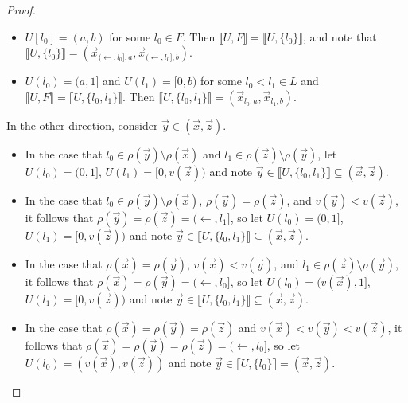 \documentclass[11pt]{article}
\newcommand{\vect}{\vec}
\newcommand{\lb}{\llbracket}
\newcommand{\rb}{\rrbracket}
\begin{document}
\begin{proof}
    \begin{itemize}
      \item
        \(U[l_0]=(a,b)\) for some \(l_0\in F\).
        Then \(\lb U,F\rb=\lb U,\{l_0\}\rb \), and note that
        \(
          \lb U,\{l_0\}\rb
            =
          (\vect x_{(\leftarrow,l_0],a},\vect x_{(\leftarrow,l_0],b})
        \).
      \item
        \(U(l_0)=(a,1]\) and \(U(l_1)=[0,b)\) for some \(l_0<l_1\in L\)
        and \(\lb U,F\rb=\lb U,\{l_0,l_1\}\rb \). Then
        \(\lb U,\{l_0,l_1\}\rb =(\vect x_{l_0,a},\vect x_{l_1,b})\).
    \end{itemize}
    In the other direction, consider \(\vect y\in(\vect x,\vect z)\).
    \begin{itemize}
      \item
        In the case that \(l_0\in\rho(\vect y)\setminus\rho(\vect x)\)
        and \(l_1\in\rho(\vect z)\setminus\rho(\vect y)\), let
        \(U(l_0)=(0,1]\), \(U(l_1)=[0,v(\vect z))\) and note
        \(\vect y\in\lb U,\{l_0,l_1\}\rb \subseteq(\vect x,\vect z)\).
      \item
        In the case that \(l_0\in\rho(\vect y)\setminus\rho(\vect x)\),
        \(\rho(\vect y)=\rho(\vect z)\), and \(v(\vect y)<v(\vect z)\),
        it follows that \(\rho(\vect y)=\rho(\vect z)=(\leftarrow,l_1]\),
        so let \(U(l_0)=(0,1]\), \(U(l_1)=[0,v(\vect z))\) and note
        \(\vect y\in\lb U,\{l_0,l_1\}\rb \subseteq(\vect x,\vect z)\).
      \item
        In the case that
        \(\rho(\vect x)=\rho(\vect y)\), \(v(\vect x)<v(\vect y)\),
        and \(l_1\in\rho(\vect z)\setminus\rho(\vect y)\),
        it follows that \(\rho(\vect x)=\rho(\vect y)=(\leftarrow,l_0]\),
        so let \(U(l_0)=(v(\vect x),1]\), \(U(l_1)=[0,v(\vect z))\) and note
        \(\vect y\in\lb U,\{l_0,l_1\}\rb \subseteq(\vect x,\vect z)\).
      \item
        In the case that
        \(\rho(\vect x)=\rho(\vect y)=\rho(\vect z)\) and
        \(v(\vect x)<v(\vect y)<v(\vect z)\),
        it follows that
        \(\rho(\vect x)=\rho(\vect y)=\rho(\vect z)=(\leftarrow,l_0]\),
        so let \(U(l_0)=(v(\vect x),v(\vect z))\) and note
        \(\vect y\in\lb U,\{l_0\}\rb =(\vect x,\vect z)\).
    \end{itemize}


\end{proof}
\end{document}

